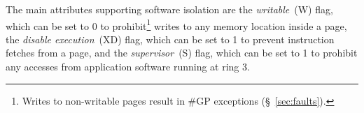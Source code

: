 
The main attributes supporting software isolation are the
\textit{writable}~(W) flag, which can be set to 0 to
prohibit\footnote{Writes to non-writable pages result in \#GP exceptions
(\S~\ref{sec:faults}).} writes to any memory location inside a page, the
\textit{disable execution}~(XD) flag, which can be set to 1 to prevent
instruction fetches from a page, and the \textit{supervisor}~(S) flag, which
can be set to 1 to prohibit any accesses from application software running at
ring 3.
